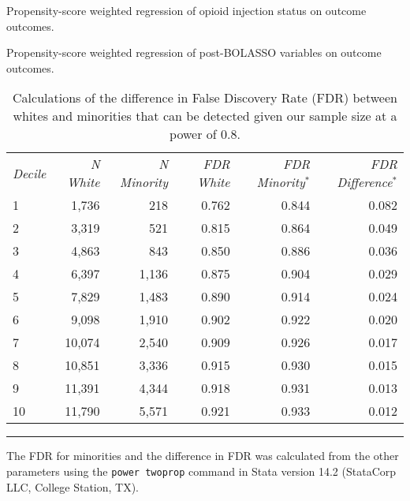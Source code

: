 \documentclass[9pt,twoside]{pnas-new}
\begin{document}
\begin{table}
\caption{Propensity-score weighted regression of opioid injection status on outcome outcomes.}
\centering
\small

\end{table}

\begin{table}
\caption{Propensity-score weighted regression of post-BOLASSO variables on outcome outcomes.}
\centering
\small

\end{table}

\begin{table}
\caption{Calculations of the difference in False Discovery Rate (FDR) between whites and minorities that can be detected given our sample size at a power of 0.8.}
\centering
\begin{tabular}{lrrrrr}
\em Decile & \em N White & \em N Minority & \em FDR White & \em FDR Minority$^*$ & \em FDR Difference$^*$ \\[0.5em]
1 & 1,736 & 218 & 0.762 & 0.844 & 0.082 \\
2 & 3,319 & 521 & 0.815 & 0.864 & 0.049 \\
3 & 4,863 & 843 & 0.850 & 0.886 & 0.036 \\
4 & 6,397 & 1,136 & 0.875 & 0.904 & 0.029 \\
5 & 7,829 & 1,483 & 0.890 & 0.914 & 0.024 \\
6 & 9,098 & 1,910 & 0.902 & 0.922 & 0.020 \\
7 & 10,074 & 2,540 & 0.909 & 0.926 & 0.017 \\
8 & 10,851 & 3,336 & 0.915 & 0.930 & 0.015 \\
9 & 11,391 & 4,344 & 0.918 & 0.931 & 0.013 \\
10 & 11,790 & 5,571 & 0.921 & 0.933 & 0.012 \\[1em]
\end{tabular}
\hrule
\begin{tablenotes}
\footnotesize
\item * The FDR for minorities and the difference in FDR was calculated from the other parameters using the \texttt{power twoprop} command in Stata version 14.2 (StataCorp LLC, College Station, TX).
\end{tablenotes}
\end{table}
\end{document}

